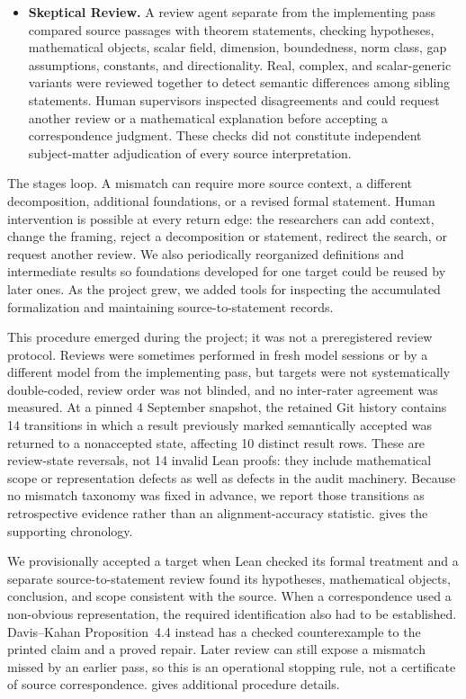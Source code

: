 \documentclass{article}
\begin{document}
\begin{itemize}
\item \textbf{Skeptical Review.}  A review agent separate from the implementing
  pass compared source passages with theorem statements, checking hypotheses,
  mathematical objects, scalar field, dimension, boundedness, norm class, gap
  assumptions, constants, and directionality.  Real, complex, and
  scalar-generic variants were reviewed together to detect semantic differences
  among sibling statements.  Human supervisors inspected disagreements and
  could request another review or a mathematical explanation before accepting a
  correspondence judgment.  These checks did not constitute independent
  subject-matter adjudication of every source interpretation.
\end{itemize}

The stages loop.  A mismatch can require more source context, a different
decomposition, additional foundations, or a revised formal statement.  Human
intervention is possible at every return edge: the researchers can add context,
change the framing, reject a decomposition or statement, redirect the search,
or request another review.  We also periodically reorganized definitions and
intermediate results so foundations developed for one target could be reused by
later ones.  As the project grew, we added tools for inspecting the accumulated
formalization and maintaining source-to-statement records.

This procedure emerged during the project; it was not a preregistered review
protocol.  Reviews were sometimes performed in fresh model sessions or by a
different model from the implementing pass, but targets were not systematically
double-coded, review order was not blinded, and no inter-rater agreement was
measured.  At a pinned 4 September snapshot, the retained Git history contains
14 transitions in which a result previously marked semantically accepted was
returned to a nonaccepted state, affecting 10 distinct result rows.  These are
review-state reversals, not 14 invalid Lean proofs: they include mathematical
scope or representation defects as well as defects in the audit machinery.
Because no mismatch taxonomy was fixed in advance, we report those transitions
as retrospective evidence rather than an alignment-accuracy statistic.
 gives the supporting chronology.

We provisionally accepted a target when Lean checked its formal treatment and a
separate source-to-statement review found its hypotheses, mathematical objects,
conclusion, and scope consistent with the source.  When a correspondence used a
non-obvious representation, the required identification also had to be
established.  Davis--Kahan Proposition~4.4 instead has a checked counterexample
to the printed claim and a proved repair.  Later review can still expose a
mismatch missed by an earlier pass, so this is an operational stopping rule, not
a certificate of source correspondence.   gives additional
procedure details.
\end{document}
